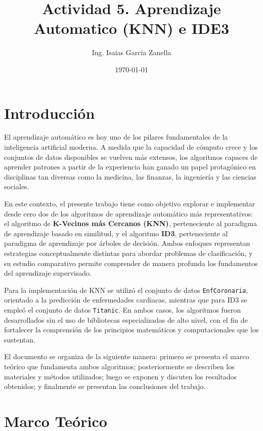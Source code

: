 \documentclass[12pt]{article}
\title{Actividad 5. Aprendizaje Automatico (KNN) e IDE3}
\author{Ing. Isaias Garcia Zanella}
\date{\today}
\begin{document}
\maketitle

\section{Introducción}

El aprendizaje automático es hoy uno de los pilares fundamentales de la inteligencia artificial moderna. A medida que la capacidad de cómputo crece y los conjuntos de datos disponibles se vuelven más extensos, los algoritmos capaces de aprender patrones a partir de la experiencia han ganado un papel protagónico en disciplinas tan diversas como la medicina, las finanzas, la ingeniería y las ciencias sociales.

En este contexto, el presente trabajo tiene como objetivo explorar e implementar desde cero dos de los algoritmos de aprendizaje automático más representativos: el algoritmo de \textbf{K-Vecinos más Cercanos (KNN)}, perteneciente al paradigma de aprendizaje basado en similitud, y el algoritmo \textbf{ID3}, perteneciente al paradigma de aprendizaje por árboles de decisión. Ambos enfoques representan estrategias conceptualmente distintas para abordar problemas de clasificación, y su estudio comparativo permite comprender de manera profunda los fundamentos del aprendizaje supervisado.

Para la implementación de KNN se utilizó el conjunto de datos \texttt{EnfCoronaria}, orientado a la predicción de enfermedades cardiacas, mientras que para ID3 se empleó el conjunto de datos \texttt{Titanic}. En ambos casos, los algoritmos fueron desarrollados sin el uso de bibliotecas especializadas de alto nivel, con el fin de fortalecer la comprensión de los principios matemáticos y computacionales que los sustentan.

El documento se organiza de la siguiente manera: primero se presenta el marco teórico que fundamenta ambos algoritmos; posteriormente se describen los materiales y métodos utilizados; luego se exponen y discuten los resultados obtenidos; y finalmente se presentan las conclusiones del trabajo.

\section{Marco Teórico}
\end{document}
